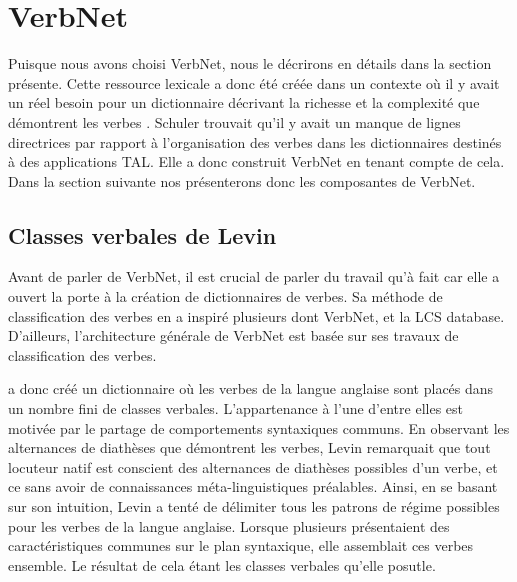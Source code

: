 

\section{VerbNet}

Puisque nous avons choisi VerbNet, nous le décrirons en détails dans la section présente. Cette ressource lexicale a donc été créée dans un contexte où il y avait un réel besoin pour un dictionnaire décrivant la richesse et la complexité que démontrent les verbes \citep{KipperClassBasedConstructionVerb2000}. Schuler trouvait qu'il y avait un manque de lignes directrices par rapport à l'organisation des verbes dans les dictionnaires destinés à des applications \ac{TAL}. Elle a donc construit VerbNet en tenant compte de cela. Dans la section suivante nos présenterons donc les composantes de VerbNet. 

\subsection{Classes verbales de Levin}

Avant de parler de VerbNet, il est crucial de parler du travail qu'à fait \cite{verb-classes.levin.1993} car elle a ouvert la porte à la création de dictionnaires de verbes. Sa méthode de classification des verbes en a inspiré plusieurs dont VerbNet\cite{SchulerVerbnetBroadcoverageComprehensive2005}, et la LCS database\citep{AyanGeneratingParsingLexicon2002a}\citep{DorrUseLexicalSemantics1992}. D'ailleurs, l'architecture générale de VerbNet est basée sur ses travaux de classification des verbes.

\cite{verb-classes.levin.1993} a donc créé un dictionnaire où les verbes de la langue anglaise sont placés dans un nombre fini de classes verbales. L'appartenance à l'une d'entre elles est motivée par le partage de comportements syntaxiques communs. En observant les alternances de diathèses que démontrent les verbes, Levin remarquait que tout locuteur natif est conscient des alternances de diathèses possibles d'un verbe, et ce sans avoir de connaissances méta-linguistiques préalables. Ainsi, en se basant sur son intuition, Levin a tenté de délimiter tous les patrons de régime possibles pour les verbes de la langue anglaise. Lorsque plusieurs présentaient des caractéristiques communes sur le plan syntaxique, elle assemblait ces verbes ensemble. Le résultat de cela étant les classes verbales qu'elle posutle.

